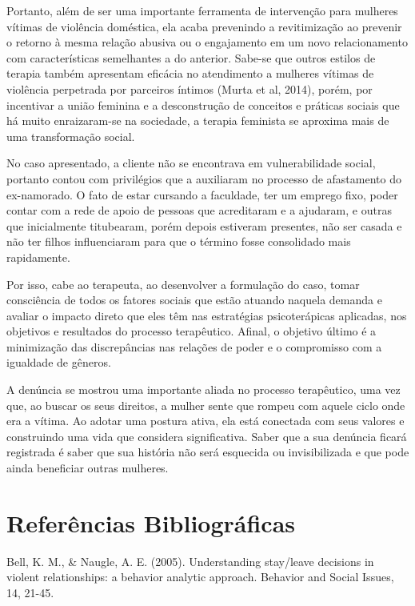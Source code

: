 Portanto, além de ser uma importante ferramenta de intervenção para mulheres vítimas de violência doméstica, ela acaba prevenindo a revitimização ao prevenir o retorno à mesma relação abusiva ou o engajamento em um novo relacionamento com características semelhantes a do anterior. Sabe-se que outros estilos de terapia também apresentam eficácia no atendimento a mulheres vítimas de violência perpetrada por parceiros íntimos (Murta et al, 2014), porém, por incentivar a união feminina e a desconstrução de conceitos e práticas sociais que há muito enraizaram-se na sociedade, a terapia feminista se aproxima mais de uma transformação social.

No caso apresentado, a cliente não se encontrava em vulnerabilidade social, portanto contou com privilégios que a auxiliaram no processo de afastamento do ex-namorado. O fato de estar cursando a faculdade, ter um emprego fixo, poder contar com a rede de apoio de pessoas que acreditaram e a ajudaram, e outras que inicialmente titubearam, porém depois estiveram presentes, não ser casada e não ter filhos influenciaram para que o término fosse consolidado mais rapidamente.

Por isso, cabe ao terapeuta, ao desenvolver a formulação do caso, tomar consciência de todos os fatores sociais que estão atuando naquela demanda e avaliar o impacto direto que eles têm nas estratégias psicoterápicas aplicadas, nos objetivos e resultados do processo terapêutico. Afinal, o objetivo último é a minimização das discrepâncias nas relações de poder e o compromisso com a igualdade de gêneros.

A denúncia se mostrou uma importante aliada no processo terapêutico, uma vez que, ao buscar os seus direitos, a mulher sente que rompeu com aquele ciclo onde era a vítima. Ao adotar uma postura ativa, ela está conectada com seus valores e construindo uma vida que considera significativa. Saber que a sua denúncia ficará registrada é saber que sua história não será esquecida ou invisibilizada e que pode ainda beneficiar outras mulheres.

\section*{Referências Bibliográficas}

\hangindent=25pt
\noindent Bell, K. M., \& Naugle, A. E. (2005). Understanding stay/leave decisions in violent relationships: a behavior analytic approach. Behavior and Social Issues, 14, 21-45.


